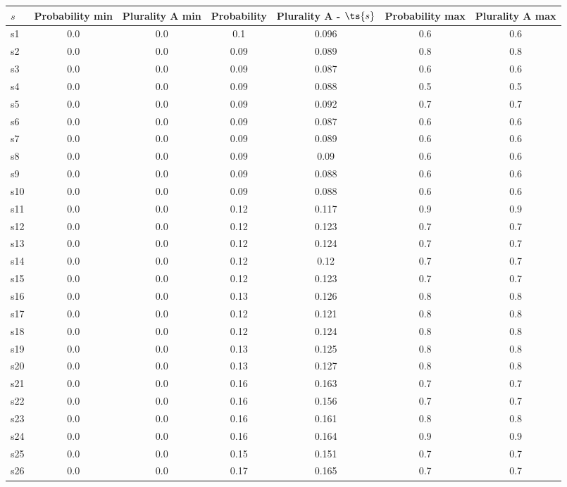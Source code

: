 \documentclass{article}
\begin{document}
\noindent\begin{tabular}{|l|c|c|c|c|c|c|}
\hline
$s$& Probability min & Plurality A min & Probability & Plurality A - $\ts{s}$ & Probability max & Plurality A max\\
\hline
s1 &0.0 & 0.0 & 0.1 & 0.096 & 0.6 & 0.6\\
\hline
s2 &0.0 & 0.0 & 0.09 & 0.089 & 0.8 & 0.8\\
\hline
s3 &0.0 & 0.0 & 0.09 & 0.087 & 0.6 & 0.6\\
\hline
s4 &0.0 & 0.0 & 0.09 & 0.088 & 0.5 & 0.5\\
\hline
s5 &0.0 & 0.0 & 0.09 & 0.092 & 0.7 & 0.7\\
\hline
s6 &0.0 & 0.0 & 0.09 & 0.087 & 0.6 & 0.6\\
\hline
s7 &0.0 & 0.0 & 0.09 & 0.089 & 0.6 & 0.6\\
\hline
s8 &0.0 & 0.0 & 0.09 & 0.09 & 0.6 & 0.6\\
\hline
s9 &0.0 & 0.0 & 0.09 & 0.088 & 0.6 & 0.6\\
\hline
s10 &0.0 & 0.0 & 0.09 & 0.088 & 0.6 & 0.6\\
\hline
s11 &0.0 & 0.0 & 0.12 & 0.117 & 0.9 & 0.9\\
\hline
s12 &0.0 & 0.0 & 0.12 & 0.123 & 0.7 & 0.7\\
\hline
s13 &0.0 & 0.0 & 0.12 & 0.124 & 0.7 & 0.7\\
\hline
s14 &0.0 & 0.0 & 0.12 & 0.12 & 0.7 & 0.7\\
\hline
s15 &0.0 & 0.0 & 0.12 & 0.123 & 0.7 & 0.7\\
\hline
s16 &0.0 & 0.0 & 0.13 & 0.126 & 0.8 & 0.8\\
\hline
s17 &0.0 & 0.0 & 0.12 & 0.121 & 0.8 & 0.8\\
\hline
s18 &0.0 & 0.0 & 0.12 & 0.124 & 0.8 & 0.8\\
\hline
s19 &0.0 & 0.0 & 0.13 & 0.125 & 0.8 & 0.8\\
\hline
s20 &0.0 & 0.0 & 0.13 & 0.127 & 0.8 & 0.8\\
\hline
s21 &0.0 & 0.0 & 0.16 & 0.163 & 0.7 & 0.7\\
\hline
s22 &0.0 & 0.0 & 0.16 & 0.156 & 0.7 & 0.7\\
\hline
s23 &0.0 & 0.0 & 0.16 & 0.161 & 0.8 & 0.8\\
\hline
s24 &0.0 & 0.0 & 0.16 & 0.164 & 0.9 & 0.9\\
\hline
s25 &0.0 & 0.0 & 0.15 & 0.151 & 0.7 & 0.7\\
\hline
s26 &0.0 & 0.0 & 0.17 & 0.165 & 0.7 & 0.7\\
\hline

\end{tabular}
\end{document}
